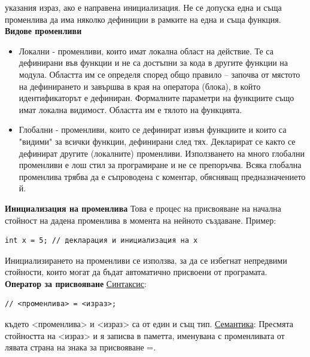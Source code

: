 \documentclass{article}
\begin{document}
указания израз, ако е направена инициализация. Не се допуска една и съща променлива да има няколко дефиниции
в рамките на една и съща функция. \newline\newline
\textbf{Видове променливи}
\begin{itemize}
    \item Локални - променливи, които имат локална област на действие. Те са дефинирани във функции и не са достъпни за кода в
    другите функции на модула. Областта им се определя според общо правило – започва от мястото на дефинирането и завършва в
    края на оператора (блока), в който идентификаторът е дефиниран. Формалните параметри на функциите също имат локална видимост.
    Областта им е тялото на функцията.
    \item Глобални - променливи, които се дефинират извън функциите и които са "видими" за всички функции, дефинирани след тях.
    Декларират се както се дефинират другите (локалните) променливи. Използването на много глобални променливи е лош стил за
    програмиране и не се препоръчва. Всяка глобална променлива трябва да е съпроводена с коментар, обясняващ предназначението й.
\end{itemize}
\textbf{Инициализация на променлива} \newline\newline
Това е процес на присвояване на начална стойност на дадена променлива в момента на нейното създаване. Пример:
\begin{lstlisting}[style=cpp]
int x = 5; // декларация и инициализация на x
\end{lstlisting}
Инициализирането на променливи се използва, за да се избегнат непредвими стойности, които могат да бъдат автоматично присвоени
от програмата. \newline\newline
\textbf{Оператор за присвояване} \newline\newline
\underline{Синтаксис}:
\begin{lstlisting}[style=cpp]
// <променлива> = <израз>;
\end{lstlisting}
където <променлива> и <израз> са от един и същ тип. \newline
\underline{Семантика}: \newline
Пресмята стойността на <израз> и я записва в паметта, именувана с променливата от лявата страна на знака за присвояване =. \newline\newline
\end{document}
